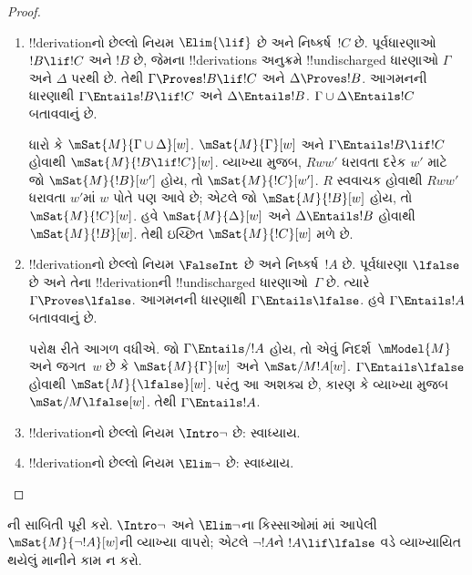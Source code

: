 \documentclass[../../../include/open-logic-section]{subfiles}
\begin{document}
\begin{proof}
\begin{enumerate}
    ધારો કે $\mSat{M}{\Gamma}[w]$. દરેક એવા $w'$ માટે
    કે $Rww'$, જો $\mSat{M}{!B}[w']$ હોય, તો
    $\mSat{M}{!C}[w']$ છે તે બતાવવું છે. તેથી
    $Rww'$ અને $\mSat{M}{!B}[w']$ ધારો.
     મુજબ
    $\mSat{M}{\Gamma}[w']$. હવે
    $\Gamma \cup \{!B\} \Entails !C$ હોવાથી
    $\mSat{M}{!C}[w']$ મળે છે, જે બતાવવાનું હતું.

  \item !!{derivation}નો છેલ્લો નિયમ $\Elim{\lif}$ છે અને
    નિષ્કર્ષ~$!C$ છે. પૂર્વધારણાઓ $!B \lif !C$ અને
    $!B$ છે, જેમના !!{derivation}s અનુક્રમે
    !!{undischarged} ધારણાઓ $\Gamma$ અને $\Delta$
    પરથી છે. તેથી $\Gamma \Proves !B \lif !C$ અને
    $\Delta \Proves !B$. આગમનની ધારણાથી
    $\Gamma \Entails !B \lif !C$ અને
    $\Delta \Entails !B$. $\Gamma \cup \Delta
    \Entails !C$ બતાવવાનું છે.

    ધારો કે $\mSat{M}{\Gamma \cup \Delta}[w]$.
    $\mSat{M}{\Gamma}[w]$ અને
    $\Gamma \Entails !B \lif !C$ હોવાથી
    $\mSat{M}{!B \lif !C}[w]$. વ્યાખ્યા મુજબ,
    $Rww'$ ધરાવતા દરેક $w'$ માટે જો
    $\mSat{M}{!B}[w']$ હોય, તો
    $\mSat{M}{!C}[w']$. $R$ સ્વવાચક હોવાથી
    $Rww'$ ધરાવતા $w'$માં $w$ પોતે પણ આવે છે;
    એટલે જો $\mSat{M}{!B}[w]$ હોય, તો
    $\mSat{M}{!C}[w]$. હવે $\mSat{M}{\Delta}[w]$
    અને $\Delta \Entails !B$ હોવાથી
    $\mSat{M}{!B}[w]$. તેથી ઇચ્છિત
    $\mSat{M}{!C}[w]$ મળે છે.

  \item !!{derivation}નો છેલ્લો નિયમ $\FalseInt$ છે અને
    નિષ્કર્ષ~$!A$ છે. પૂર્વધારણા $\lfalse$ છે અને તેના
    !!{derivation}ની !!{undischarged} ધારણાઓ~$\Gamma$ છે.
    ત્યારે $\Gamma \Proves \lfalse$. આગમનની ધારણાથી
    $\Gamma \Entails \lfalse$. હવે $\Gamma \Entails !A$
    બતાવવાનું છે.

    પરોક્ષ રીતે આગળ વધીએ. જો $\Gamma \Entails/ !A$
    હોય, તો એવું નિદર્શ~$\mModel{M}$ અને જગત~$w$
    છે કે $\mSat{M}{\Gamma}[w]$ અને
    $\mSat/{M}{!A}[w]$. $\Gamma \Entails \lfalse$
    હોવાથી $\mSat{M}{\lfalse}[w]$. પરંતુ આ અશક્ય
    છે, કારણ કે વ્યાખ્યા મુજબ $\mSat/{M}{\lfalse}[w]$.
    તેથી $\Gamma \Entails !A$.
  \item !!{derivation}નો છેલ્લો નિયમ $\Intro\lnot$ છે: સ્વાધ્યાય.
  \item !!{derivation}નો છેલ્લો નિયમ $\Elim\lnot$ છે: સ્વાધ્યાય.
  \end{enumerate}
\end{proof}

\begin{prob}
  ની સાબિતી પૂરી કરો.
  $\Intro\lnot$ અને $\Elim\lnot$ના કિસ્સાઓમાં
  માં આપેલી
  $\mSat{M}{\lnot !A}[w]$ની વ્યાખ્યા વાપરો;
  એટલે $\lnot !A$ને $!A \lif \lfalse$ વડે
  વ્યાખ્યાયિત થયેલું માનીને કામ ન કરો.
\end{prob}
\end{document}
